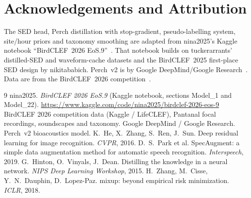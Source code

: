 \documentclass[11pt]{article}
\begin{document}
\section*{Acknowledgements and Attribution}
The SED head, Perch distillation with stop-gradient, pseudo-labelling system,
site/hour priors and taxonomy smoothing are adapted from nina2025's Kaggle
notebook ``BirdCLEF~2026 EoS.9''~\cite{nina2025}. That notebook builds on
tuckerarrants' distilled-SED and waveform-cache datasets and the BirdCLEF~2025
first-place SED design by nikitababich. Perch~v2 is by Google
DeepMind/Google Research~\cite{perch}. Data are from the BirdCLEF~2026
competition~\cite{birdclef}.

\begin{thebibliography}{9}
 nina2025. \emph{BirdCLEF 2026 EoS.9} (Kaggle notebook,
sections Model\_1 and Model\_22).
\url{https://www.kaggle.com/code/nina2025/birdclef-2026-eos-9}
 BirdCLEF 2026 competition data (Kaggle / LifeCLEF), Pantanal
focal recordings, soundscapes and taxonomy.
 Google DeepMind / Google Research. Perch~v2 bioacoustics
model.
 K.~He, X.~Zhang, S.~Ren, J.~Sun. Deep residual learning for
image recognition. \emph{CVPR}, 2016.
 D.~S.~Park et al. SpecAugment: a simple data augmentation
method for automatic speech recognition. \emph{Interspeech}, 2019.
 G.~Hinton, O.~Vinyals, J.~Dean. Distilling the knowledge
in a neural network. \emph{NIPS Deep Learning Workshop}, 2015.
 H.~Zhang, M.~Cisse, Y.~N.~Dauphin, D.~Lopez-Paz. mixup:
beyond empirical risk minimization. \emph{ICLR}, 2018.
\end{thebibliography}
\end{document}
